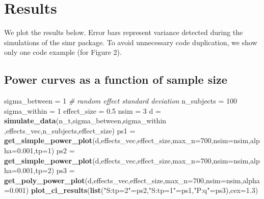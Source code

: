 \documentclass[]{article}
\newenvironment{Shaded}{\begin{snugshade}}{\end{snugshade}}
\newcommand{\KeywordTok}[1]{\textcolor[rgb]{0.13,0.29,0.53}{\textbf{#1}}}
\newcommand{\DataTypeTok}[1]{\textcolor[rgb]{0.13,0.29,0.53}{#1}}
\newcommand{\DecValTok}[1]{\textcolor[rgb]{0.00,0.00,0.81}{#1}}
\newcommand{\FloatTok}[1]{\textcolor[rgb]{0.00,0.00,0.81}{#1}}
\newcommand{\StringTok}[1]{\textcolor[rgb]{0.31,0.60,0.02}{#1}}
\newcommand{\CommentTok}[1]{\textcolor[rgb]{0.56,0.35,0.01}{\textit{#1}}}
\newcommand{\NormalTok}[1]{#1}
\begin{document}
\newpage

\section{Results}\label{results}

We plot the results below. Error bars represent variance detected during
the simulations of the simr package. To avoid unnecessary code
duplication, we show only one code example (for Figure 2).

\subsection{Power curves as a function of sample
size}\label{power-curves-as-a-function-of-sample-size}

\begin{Shaded}
\begin{Highlighting}[]
\NormalTok{sigma_between =}\StringTok{ }\DecValTok{1} \CommentTok{# random effect standard deviation}
\NormalTok{n_subjects =}\StringTok{ }\DecValTok{100}
\NormalTok{sigma_within =}\StringTok{ }\DecValTok{1}
\NormalTok{effect_size =}\StringTok{ }\FloatTok{0.5}
\NormalTok{nsim =}\StringTok{ }\DecValTok{3}
\NormalTok{d =}\StringTok{ }\KeywordTok{simulate_data}\NormalTok{(n_t,sigma_between,sigma_within ,effects_vec,n_subjects,effect_size)}
\NormalTok{ps1 =}\StringTok{ }\KeywordTok{get_simple_power_plot}\NormalTok{(d,effects_vec,effect_size,}\DataTypeTok{max_n=}\DecValTok{700}\NormalTok{,}\DataTypeTok{nsim=}\NormalTok{nsim,}\DataTypeTok{alpha=}\FloatTok{0.001}\NormalTok{,}\DataTypeTok{tp=}\DecValTok{1}\NormalTok{)}
\NormalTok{ps2 =}\StringTok{ }\KeywordTok{get_simple_power_plot}\NormalTok{(d,effects_vec,effect_size,}\DataTypeTok{max_n=}\DecValTok{700}\NormalTok{,}\DataTypeTok{nsim=}\NormalTok{nsim,}\DataTypeTok{alpha=}\FloatTok{0.001}\NormalTok{,}\DataTypeTok{tp=}\DecValTok{2}\NormalTok{)}
\NormalTok{ps3 =}\StringTok{ }\KeywordTok{get_poly_power_plot}\NormalTok{(d,effects_vec,effect_size,}\DataTypeTok{max_n=}\DecValTok{700}\NormalTok{,}\DataTypeTok{nsim=}\NormalTok{nsim,}\DataTypeTok{alpha=}\FloatTok{0.001}\NormalTok{)}
\KeywordTok{plot_ci_results}\NormalTok{(}\KeywordTok{list}\NormalTok{(}\StringTok{"S:tp=2"}\NormalTok{=ps2,}\StringTok{"S:tp=1"}\NormalTok{=ps1,}\StringTok{"P:q"}\NormalTok{=ps3),}\DataTypeTok{cex=}\FloatTok{1.3}\NormalTok{)}
\end{Highlighting}
\end{Shaded}
\end{document}
